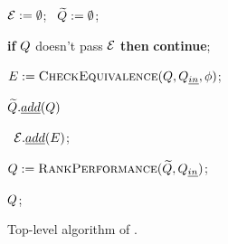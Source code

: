 \begin{figure}[!t]
\vspace{-5pt}
\footnotesize
\centering

\begin{algorithm}[H]
\begin{algorithmic}[1]


\Statex{}


\Statex{}

\vspace{2pt}

\State $\mathcal{E} := \emptyset$; \  $\widetilde{Q} := \emptyset$; 
\label{slab:alg:toplevelalg:init}



\label{slab:alg:toplevelalg:whilebegin} 



 \label{slab:alg:toplevelalg:forloop}


\State \textbf{if} $Q$ doesn't pass  $\mathcal{E}$ \textbf{then} \textbf{continue}; \label{slab:alg:toplevelalg:satisfycounterexample}


\State $E := \textsc{CheckEquivalence}(Q, Q_{\emph{in}}, \phi)$;\label{slab:alg:toplevelalg:checkequiv}

\vspace{1pt}

$\widetilde{Q}.\emph{add}(Q)$
\label{slab:alg:toplevelalg:nocounterexample}

\Else \ $\mathcal{E}.\emph{add}( E )$;
\label{slab:alg:toplevelalg:addcounterexample}

\EndIf

\EndFor


\EndWhile
\label{slab:alg:toplevelalg:whileend}

\vspace{-1pt}
\State $Q := \textsc{RankPerformance}(\widetilde{Q}, Q_{\emph{in}})$;
\label{slab:alg:toplevelalg:checkfaster}

\State \Return $Q$;
\label{slab:alg:toplevelalg:returnquery}

\caption{{Top-level algorithm of \toolname.}}
\label{slab:alg:toplevelalg}
\end{algorithmic}
\end{algorithm}
\vspace{-10pt}
\end{figure}

